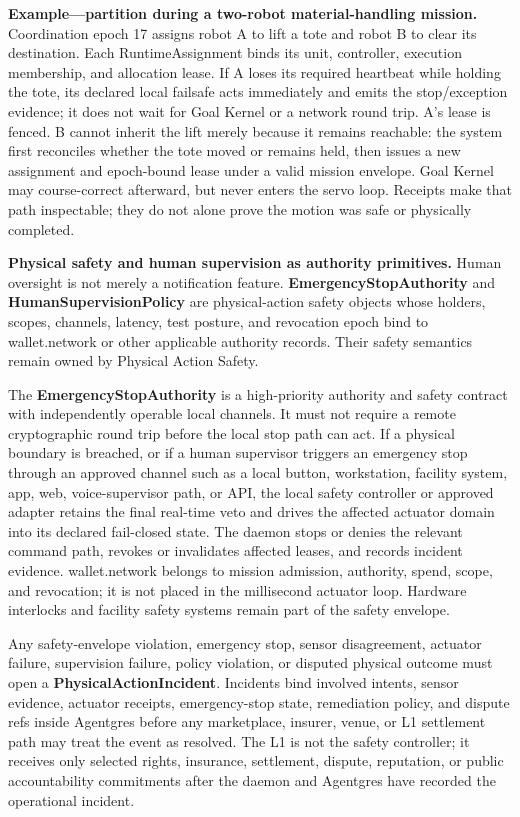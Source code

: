\documentclass[
  11pt,
]{article}
\begin{document}
\textbf{Example---partition during a two-robot material-handling mission.}
Coordination epoch 17 assigns robot A to lift a tote and robot B to clear its
destination. Each RuntimeAssignment binds its unit, controller, execution
membership, and allocation lease. If A loses its required heartbeat while
holding the tote, its declared local failsafe acts immediately and emits the
stop/exception evidence; it does not wait for Goal Kernel or a network round
trip. A's lease is fenced. B cannot inherit the lift merely because it remains
reachable: the system first reconciles whether the tote moved or remains held,
then issues a new assignment and epoch-bound lease under a valid mission
envelope. Goal Kernel may course-correct afterward, but never enters the servo
loop. Receipts make that path inspectable; they do not alone prove the motion
was safe or physically completed.

\textbf{Physical safety and human supervision as authority primitives.}
Human oversight is not merely a notification feature.
\textbf{EmergencyStopAuthority} and \textbf{HumanSupervisionPolicy} are
physical-action safety objects whose holders, scopes, channels, latency,
test posture, and revocation epoch bind to wallet.network or other applicable
authority records. Their safety semantics remain owned by Physical Action
Safety.

The \textbf{EmergencyStopAuthority} is a high-priority authority and safety
contract with independently operable local channels. It must not require a
remote cryptographic round trip before the local stop path can act. If a
physical boundary is breached, or
if a human supervisor triggers an emergency stop through an approved
channel such as a local button, workstation, facility system, app, web,
voice-supervisor path, or API, the local safety controller or approved
adapter retains the final real-time veto and drives the affected actuator
domain into its declared fail-closed state. The daemon stops or denies the
relevant command path, revokes or invalidates affected leases, and records
incident evidence. wallet.network belongs to mission admission, authority,
spend, scope, and revocation; it is not placed in the millisecond actuator
loop. Hardware interlocks and facility safety systems remain part of the
safety envelope.

Any safety-envelope violation, emergency stop, sensor disagreement,
actuator failure, supervision failure, policy violation, or disputed
physical outcome must open a \textbf{PhysicalActionIncident}. Incidents
bind involved intents, sensor evidence, actuator receipts, emergency-stop
state, remediation policy, and dispute refs inside Agentgres before any
marketplace, insurer, venue, or L1 settlement path may treat the event as
resolved. The L1 is not the safety controller; it receives only selected
rights, insurance, settlement, dispute, reputation, or public
accountability commitments after the daemon and Agentgres have recorded
the operational incident.
\end{document}
